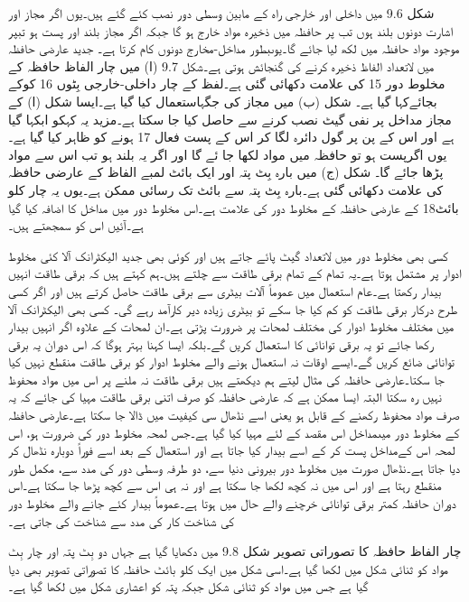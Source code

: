 	شکل 9.6 میں داخلی اور خارجی راہ کے مابین وسطی دور نصب کئے گئے ہیں۔یوں اگر مجاز اور اشارت دونوں بلند ہوں تب پر حافظہ میں ذخیرہ مواد خارج ہو گا جبکہ اگر مجاز بلند اور  پست ہو تبپر موجود مواد حافظہ میں لکھ لیا جائے گا۔یوںبطور مداخل-مخارج دونوں کام کرتا ہے۔
	جدید عارضی حافظہ میں لاتعداد الفاظ ذخیرہ کرنے کی گنجائش ہوتی ہے۔شکل 9.7 (ا) میں چار الفاظ حافظہ کے مخلوط دور 15 کی علامت دکھائی گئی ہے۔لفظ کے چار داخلی-خارجی بِٹوں 16 کوکے بجائےکہا گیا ہے۔
	شکل (ب) میں مجاز کی جگہاستعمال کیا گیا ہے۔ایسا شکل (ا) کے مجاز مداخل پر نفی گیٹ نصب کرنے سے حاصل کیا جا سکتا ہے۔مزید یہ کہکو ابکہا گیا ہے اور اس کے پن پر گول دائرہ لگا کر اس کے پست فعال 17 ہونے کو ظاہر کیا گیا ہے۔یوں اگرپست ہو تو حافظہ میں مواد لکھا جا ئے گا اور اگر یہ بلند ہو تب اس سے مواد پڑھا جائے گا۔
	شکل (ج) میں  بارہ بِٹ پتہ اور ایک بائٹ لمبے الفاظ کے عارضی حافظہ کی علامت دکھائی گئی ہے۔بارہ بِٹ پتہ سے بائٹ تک رسائی ممکن ہے۔یوں یہ چار کلو بائٹ18 کے عارضی حافظہ کے مخلوط دور کی علامت ہے۔اس مخلوط دور میں مداخل کا اضافہ کیا گیا ہے۔آئیں اس کو سمجھتے ہیں۔


	کسی بھی مخلوط دور میں لاتعداد گیٹ پائے جاتے ہیں اور کوئی بھی جدید الیکٹرانک آلا کئی مخلوط ادوار پر مشتمل ہوتا ہے۔یہ تمام کے تمام برقی طاقت سے چلتے ہیں۔ہم کہتے ہیں کہ برقی طاقت انہیں بیدار رکھتا ہے۔عام استعمال میں عموماً آلات بیٹری سے برقی طاقت حاصل کرتے ہیں اور اگر کسی طرح درکار برقی طاقت کو کم کیا جا سکے تو بیٹری زیادہ دیر کارآمد رہے گی۔
	کسی بھی الیکٹرانک آلا میں مختلف مخلوط ادوار کی مختلف لمحات پر ضرورت پڑتی ہے۔ان لمحات کے علاوہ اگر انہیں بیدار رکھا جائے تو یہ برقی توانائی کا استعمال کریں گے۔بلکہ ایسا کہنا بہتر ہوگا کہ اس دوران یہ برقی توانائی ضائع کریں گے۔ایسے اوقات نہ استعمال ہونے والے مخلوط ادوار کو برقی طاقت منقطع نہیں کیا جا سکتا۔عارضی حافظہ کی مثال لیتے ہم دیکھتے ہیں برقی طاقت نہ ملنے پر اس میں مواد محفوظ نہیں رہ سکتا البتہ ایسا ممکن ہے کہ عارضی حافظہ کو صرف اتنی برقی طاقت مہیا کی جائے کہ یہ صرف مواد محفوظ رکھنے کے قابل ہو یعنی اسے نڈھال سی کیفیت میں ڈالا جا سکتا ہے۔عارضی حافظہ کے مخلوط دور میںمداخل اس مقصد کے لئے مہیا کیا گیا ہے۔جس لمحہ مخلوط دور کی ضرورت ہو، اس لمحہ اس کےمداخل پست کر کے اسے بیدار کیا جاتا ہے اور استعمال کے بعد اسے فوراً دوبارہ نڈھال کر دیا جاتا ہے۔نڈھال صورت میں مخلوط دور بیرونی دنیا سے، دو طرفہ وسطی دور کی مدد سے، مکمل طور منقطع رہتا ہے اور اس میں نہ کچھ لکھا جا سکتا ہے اور نہ ہی اس سے کچھ پڑھا جا سکتا ہے۔اس دوران حافظہ کمتر برقی توانائی خرچنے والے حال میں ہوتا ہے۔عموماً بیدار کئے جانے والے مخلوط دور کی شناخت کار کی مدد سے شناخت کی جاتی ہے۔



	چار الفاظ حافظہ کا تصوراتی تصویر شکل 9.8 میں دکھایا گیا ہے جہاں دو بِٹ پتہ اور چار بِٹ مواد کو ثنائی شکل میں لکھا گیا ہے۔اسی شکل میں ایک کلو بائٹ حافظہ کا تصوراتی تصویر بھی دیا گیا ہے جس میں مواد کو ثنائی شکل جبکہ پتہ کو اعشاری شکل میں لکھا گیا ہے۔

